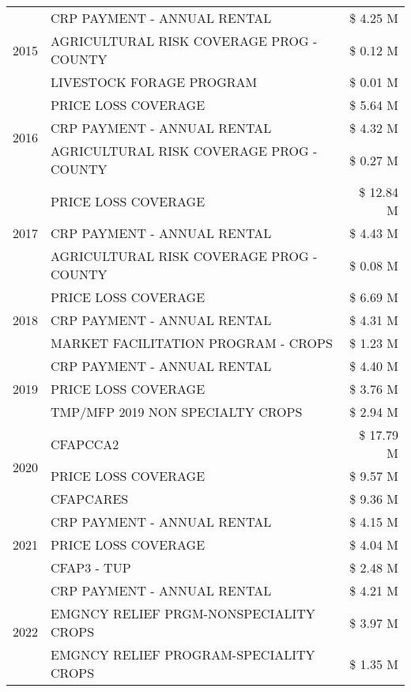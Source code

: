 \begin{tabular}{llr}
\cline{1-3}
\multirow[t]{3}{*}{2015} & CRP PAYMENT - ANNUAL RENTAL & \$ 4.25 M \\
 & AGRICULTURAL RISK COVERAGE PROG - COUNTY & \$ 0.12 M \\
 & LIVESTOCK FORAGE PROGRAM & \$ 0.01 M \\
\cline{1-3}
\multirow[t]{3}{*}{2016} & PRICE LOSS COVERAGE & \$ 5.64 M \\
 & CRP PAYMENT - ANNUAL RENTAL & \$ 4.32 M \\
 & AGRICULTURAL RISK COVERAGE PROG - COUNTY & \$ 0.27 M \\
\cline{1-3}
\multirow[t]{3}{*}{2017} & PRICE LOSS COVERAGE & \$ 12.84 M \\
 & CRP PAYMENT - ANNUAL RENTAL & \$ 4.43 M \\
 & AGRICULTURAL RISK COVERAGE PROG - COUNTY & \$ 0.08 M \\
\cline{1-3}
\multirow[t]{3}{*}{2018} & PRICE LOSS COVERAGE & \$ 6.69 M \\
 & CRP PAYMENT - ANNUAL RENTAL & \$ 4.31 M \\
 & MARKET FACILITATION PROGRAM - CROPS & \$ 1.23 M \\
\cline{1-3}
\multirow[t]{3}{*}{2019} & CRP PAYMENT - ANNUAL RENTAL & \$ 4.40 M \\
 & PRICE LOSS COVERAGE & \$ 3.76 M \\
 & TMP/MFP 2019 NON SPECIALTY CROPS & \$ 2.94 M \\
\cline{1-3}
\multirow[t]{3}{*}{2020} & CFAPCCA2 & \$ 17.79 M \\
 & PRICE LOSS COVERAGE & \$ 9.57 M \\
 & CFAPCARES & \$ 9.36 M \\
\cline{1-3}
\multirow[t]{3}{*}{2021} & CRP PAYMENT - ANNUAL RENTAL & \$ 4.15 M \\
 & PRICE LOSS COVERAGE & \$ 4.04 M \\
 & CFAP3 - TUP & \$ 2.48 M \\
\cline{1-3}
\multirow[t]{3}{*}{2022} & CRP PAYMENT - ANNUAL RENTAL & \$ 4.21 M \\
 & EMGNCY RELIEF PRGM-NONSPECIALITY CROPS & \$ 3.97 M \\
 & EMGNCY RELIEF PROGRAM-SPECIALITY CROPS & \$ 1.35 M \\
\cline{1-3}
\bottomrule
\end{tabular}
